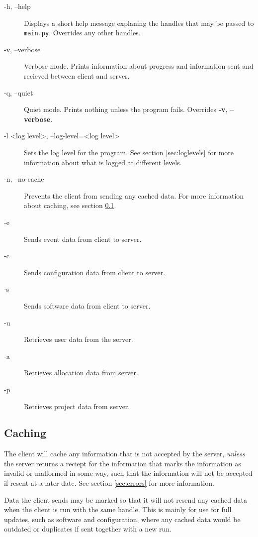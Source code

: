 \documentclass[titlepage, a4paper,10pt]{article}
\begin{document}
\begin{description}
    \item[-h, --help]   Displays a short help message explaning the handles
    that may be passed to \texttt{main.py}. Overrides any other handles.
    \item[-v, --verbose]    Verbose mode. Prints information about progress and
    information sent and recieved between client and server. 
    \item[-q, --quiet]  Quiet mode. Prints nothing unless the program fails.
    Overrides \textbf{-v}, \textbf{--verbose}.
    \item[-l \textless log level\textgreater, --log-level=\textless log
    level\textgreater] Sets the log level for the program. See section 
    \ref{sec:loglevels} for more information about what is logged at different 
    levels.
    \item[-n, --no-cache]   Prevents the client from sending any cached data.
    For more information about caching, see section \ref{sec:caching}.
    \item[-e]   Sends event data from client to server.
    \item[-c]   Sends configuration data from client to server.
    \item[-s]   Sends software data from client to server.
    \item[-u]   Retrieves user data from the server.
    \item[-a]   Retrieves allocation data from server.
    \item[-p]   Retrieves project data from server.
\end{description}

\subsection{Caching}
\label{sec:caching}
The client will cache any information that is not accepted by the server, 
\textit{unless} the server returns a reciept for the information that marks the 
information as invalid or malformed in some way, such that the information will 
not be accepted if resent at a later date. See section \ref{sec:errors} for
more information.

Data the client sends may be marked so that it will not resend any cached data
when the client is run with the same handle. This is mainly for use for full
updates, such as software and configuration, where any cached data would be
outdated or duplicates if sent together with a new run.
\end{document}
